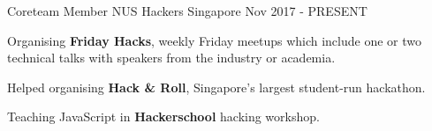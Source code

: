 

\begin{cventries}

 \cventry
    {Coreteam Member} %
    {NUS Hackers} %
    {Singapore} %
    {Nov 2017 - PRESENT} %
    {
      \begin{cvitems} %
      	\item {Organising \textbf{Friday Hacks}, weekly Friday meetups which include one or two technical talks with speakers from the industry or academia.}
      	\item {Helped organising \textbf{Hack \& Roll}, Singapore's largest student-run hackathon.}
      	\item {Teaching JavaScript in \textbf{Hackerschool} hacking workshop.}
      \end{cvitems}
    }
    
%    
\end{cventries}
